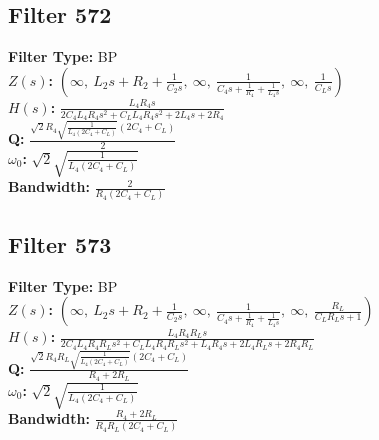 \documentclass{article}
\begin{document}
\subsection*{Filter 572}
\textbf{Filter Type:} BP \\ 
\textbf{$Z(s)$:} $\left( \infty, \  L_{2} s + R_{2} + \frac{1}{C_{2} s}, \  \infty, \  \frac{1}{C_{4} s + \frac{1}{R_{4}} + \frac{1}{L_{4} s}}, \  \infty, \  \frac{1}{C_{L} s}\right)$ \\ 
\textbf{$H(s)$:} $\frac{L_{4} R_{4} s}{2 C_{4} L_{4} R_{4} s^{2} + C_{L} L_{4} R_{4} s^{2} + 2 L_{4} s + 2 R_{4}}$ \\ 
\textbf{Q:} $\frac{\sqrt{2} R_{4} \sqrt{\frac{1}{L_{4} \left(2 C_{4} + C_{L}\right)}} \left(2 C_{4} + C_{L}\right)}{2}$ \\ 
\textbf{$\omega_0$:} $\sqrt{2} \sqrt{\frac{1}{L_{4} \left(2 C_{4} + C_{L}\right)}}$ \\ 
\textbf{Bandwidth:} $\frac{2}{R_{4} \left(2 C_{4} + C_{L}\right)}$ \\ 
\subsection*{Filter 573}
\textbf{Filter Type:} BP \\ 
\textbf{$Z(s)$:} $\left( \infty, \  L_{2} s + R_{2} + \frac{1}{C_{2} s}, \  \infty, \  \frac{1}{C_{4} s + \frac{1}{R_{4}} + \frac{1}{L_{4} s}}, \  \infty, \  \frac{R_{L}}{C_{L} R_{L} s + 1}\right)$ \\ 
\textbf{$H(s)$:} $\frac{L_{4} R_{4} R_{L} s}{2 C_{4} L_{4} R_{4} R_{L} s^{2} + C_{L} L_{4} R_{4} R_{L} s^{2} + L_{4} R_{4} s + 2 L_{4} R_{L} s + 2 R_{4} R_{L}}$ \\ 
\textbf{Q:} $\frac{\sqrt{2} R_{4} R_{L} \sqrt{\frac{1}{L_{4} \left(2 C_{4} + C_{L}\right)}} \left(2 C_{4} + C_{L}\right)}{R_{4} + 2 R_{L}}$ \\ 
\textbf{$\omega_0$:} $\sqrt{2} \sqrt{\frac{1}{L_{4} \left(2 C_{4} + C_{L}\right)}}$ \\ 
\textbf{Bandwidth:} $\frac{R_{4} + 2 R_{L}}{R_{4} R_{L} \left(2 C_{4} + C_{L}\right)}$ \\ 
\end{document}
